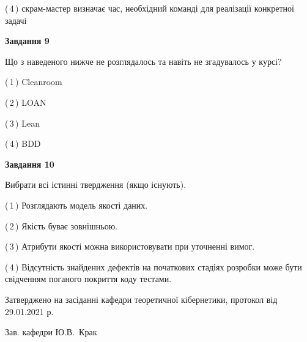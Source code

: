 \documentclass[10pt, ukrainian]{article}
\begin{document}
{\begin {large}
(\,4\,) скрам-мастер визначає час, необхідний команді для реалізації конкретної задачі%


{\begin {center}\textbf{Завдання 9}\end {center}}\par
Що з наведеного нижче не розглядалось та навіть не згадувалось у курсі?\par
\vspace{2mm}



(\,1\,) Cleanroom%



(\,2\,) LOAN%



(\,3\,) Lean%



(\,4\,) BDD%


{\begin {center}\textbf{Завдання 10}\end {center}}\par
Вибрати всі істинні твердження (якщо існують).\par
\vspace{2mm}



(\,1\,) Розглядають модель якості даних.%



(\,2\,) Якість буває зовнішньою.%



(\,3\,) Атрибути якості можна використовувати при уточненні вимог.%



(\,4\,) Відсутність знайдених дефектів на початкових стадіях розробки може бути свідченням поганого покриття коду тестами.%



\end {large}}
{\vspace{5mm}\smallskip \begin {small} Затверджено на засіданні кафедри теоретичної кібернетики, протокол  від   29.01.2021 р.\par\smallskip\smallskip
{\parbox {6.5 cm}{Зав. кафедри \dotfill Ю.В.~Крак}} \end{small}}
\newpage
\end{document}

